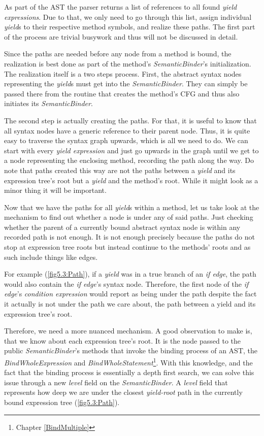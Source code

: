 As part of the AST the parser returns a list of references to all found \emph{yield expressions}. Due to that, we only need to go through this list, assign individual \emph{yield}s to their respective method symbols, and realize these paths. The first part of the process are trivial busywork and thus will not be discussed in detail. 

Since the paths are needed before any node from a method is bound, the realization is best done as part of the method’s \emph{SemanticBinder}’s initialization. The realization itself is a two steps process. First, the abstract syntax nodes representing the \emph{yield}s must get into the \emph{SemanticBinder}. They can simply be passed there from the routine that creates the method’s CFG and thus also initiates its \emph{SemanticBinder}. 

The second step is actually creating the paths. For that, it is useful to know that all syntax nodes have a generic reference to their parent node. Thus, it is quite easy to traverse the syntax graph upwards, which is all we need to do. We can start with every \emph{yield expression} and just go upwards in the graph until we get to a node representing the enclosing method, recording the path along the way. Do note that paths created this way are not the paths between a \emph{yield} and its expression tree’s root but a \emph{yield} and the method’s root. While it might look as a minor thing it will be important.

Now that we have the paths for all \emph{yield}s within a method, let us take look at the mechanism to find out whether a node is under any of said paths. Just checking whether the parent of a currently bound abstract syntax node is within any recorded path is not enough. It is not enough precisely because the paths do not stop at expression tree roots but instead continue to the methods’ roots and as such include things like edges. 

For example (\autoref{fig5.3:Path}), if a \emph{yield} was in a true branch of an \emph{if edge}, the path would also contain the \emph{if edge}’s syntax node. Therefore, the first node of the \emph{if edge}’s \emph{condition expression} would report as being under the path despite the fact it actually is not under the path we care about, the path between a yield and its expression tree’s root.

Therefore, we need a more nuanced mechanism. A good observation to make is, that we know about each expression tree’s root. It is the node passed to the public \emph{SemanticBinder}’s methods that invoke the binding process of an AST, the \emph{BindWholeExpression} and \emph{BindWholeStatement}\footnote{Chapter \ref{BindMultiple}}. With this knowledge, and the fact that the binding process is essentially a depth first search, we can solve this issue through a new \emph{level} field on the \emph{SemanticBinder}. A \emph{level} field that represents how deep we are under the closest \emph{yield-root} path in the currently bound expression tree (\autoref{fig5.3:Path}).

